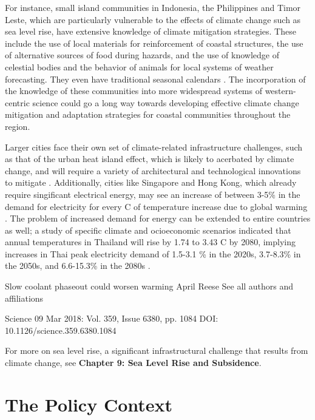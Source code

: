 For instance, small island communities in Indonesia, the Philippines and Timor Leste, which are particularly vulnerable to the effects of climate change such as sea level rise,  have extensive knowledge of climate mitigation strategies. These include the use of local materials for reinforcement of coastal structures, the use of alternative sources of food during hazards, and the use of knowledge of celestial bodies and the behavior of animals for local systems of weather forecasting. They even have traditional seasonal calendars \citep{indig}. The incorporation of the knowledge of these communities into more widespread systems of western-centric science could go a long way towards developing effective climate change mitigation and adaptation strategies for coastal communities throughout the region. 

Larger cities face their own set of climate-related infrastructure challenges, such as that of the urban heat island effect, which is likely to acerbated by climate change, and will require a variety of architectural and technological innovations to mitigate \citep{urbanheatisland}. Additionally, cities like Singapore and Hong Kong, which already require singificant electrical energy, may see an increase of between 3-5\% in the demand for electricity for every \degree C of temperature increase due to global warming \citep{singaporehongkong}. The problem of increased demand for energy can be extended to entire countries as well; a study of specific climate and ocioeconomic scenarios indicated that annual temperatures in Thailand will rise by 1.74 to 3.43 \degree C by 2080, implying increases in Thai peak electricity demand of 1.5-3.1 \% in the 2020s, 3.7-8.3\% in the 2050s, and 6.6-15.3\% in the 2080s \citep{thailandelectricity}. 

Slow coolant phaseout could worsen warming
April Reese
 See all authors and affiliations

Science  09 Mar 2018:
Vol. 359, Issue 6380, pp. 1084
DOI: 10.1126/science.359.6380.1084

For more on sea level rise, a significant infrastructural challenge that results from climate change, see \textbf{Chapter 9: Sea Level Rise and Subsidence}. 

\section{The Policy Context}

